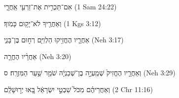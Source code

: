 
\begin{exe}

\ex\label{post_sfx_exs1}
\texthebrew{
אִם־תַּכְרִ֥ית אֶת־זַרְעִ֖י אַֽחֲרָ֑י 
} (1 Sam 24:22)

\ex\label{post_sfx_exs2}
\texthebrew{
וְאַחֲרֶ֖יךָ לֹא־יָק֥וּם כָּמֹֽוךָ׃ 
} (1 Kgs 3:12)

\ex\label{post_sfx_exs3}
\texthebrew{
אַחֲרָ֛יו הֶחֱזִ֥יקוּ הַלְוִיִּ֖ם רְח֣וּם בֶּן־בָּנִ֑י 
} (Neh 3:17)

\ex\label{post_sfx_exs4}
\texthebrew{
אַחֲרָ֨יו הֶחֱרָ֧ה 
} (Neh 3:20)

\ex\label{post_sfx_exs5}
\texthebrew{
וְאַחֲרָ֤יו הֶחֱזִיק֙ שְׁמַֽעְיָ֣ה בֶן־שְׁכַנְיָ֔ה שֹׁמֵ֖ר שַׁ֥עַר הַמִּזְרָֽח׃ ס 
} (Neh 3:29)

\ex\label{post_sfx_exs6}
\texthebrew{
וְאַחֲרֵיהֶ֗ם מִכֹּל֙ שִׁבְטֵ֣י יִשְׂרָאֵ֔ל בָּ֚אוּ יְר֣וּשָׁלִַ֔ם 
} (2 Chr 11:16)

\end{exe}
